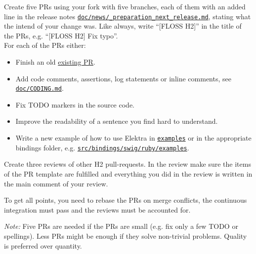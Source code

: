 \documentclass[11pt,a4paper]{article}
\begin{document}
Create five PRs using your fork with five branches, each of them with an added line in the release notes \href{https://master.libelektra.org/doc/news/_preparation_next_release.md}{\texttt{doc/news/\_preparation\_next\_release.md}}, stating what the intend of your change was.
Like always, write ``[FLOSS H2]'' in the title of the PRs, e.g. ``[FLOSS H2] Fix typo''.\\
For each of the PRs either:
\begin{itemize}
\item Finish an old \href{https://pulls.libelektra.org}{existing PR}.

\item Add code comments, assertions, log statements or inline comments, see \href{https://master.libelektra.org/doc/CODING.md}{\texttt{doc/CODING.md}}.

\item Fix TODO markers in the source code.

\item Improve the readability of a sentence you find hard to understand.



\item Write a new example of how to use Elektra in \href{https://master.libelektra.org/examples}{\texttt{examples}} or in the appropriate bindings folder, e.g. \href{https://master.libelektra.org/src/bindings/swig/ruby/examples}{\texttt{src/bindings/swig/ruby/examples}}.
\end{itemize}

Create three reviews of other H2 pull-requests.
In the review make sure the items of the PR template are fulfilled
and everything you did in the review is written in the main comment of your review.

To get all points,
you need to rebase the PRs on merge conflicts,
the continuous integration must pass and
the reviews must be accounted for.

\textit{Note:} Five PRs are needed if the PRs are small (e.g. fix only a few TODO or spellings).
Less PRs might be enough if they solve non-trivial problems.
Quality is preferred over quantity.
\end{document}
